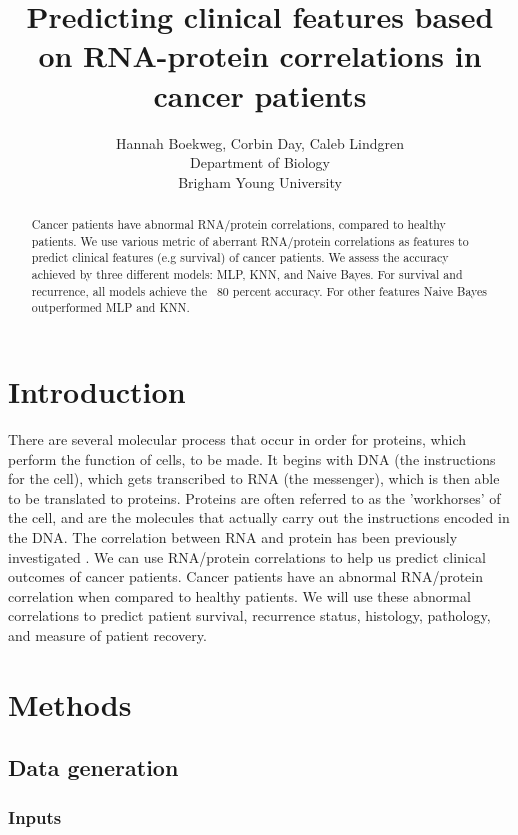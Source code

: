\documentclass{article}
\title{Predicting clinical features based on RNA-protein correlations in cancer patients}
\author{Hannah Boekweg, Corbin Day, Caleb Lindgren \\
Department of Biology\\
Brigham Young University}
\begin{document}
\maketitle

\begin{abstract}
  Cancer patients have abnormal RNA/protein correlations, compared to healthy patients.
  We use various metric of aberrant RNA/protein correlations as features to predict clinical features (e.g survival) of cancer patients.
  We assess the accuracy achieved by three different models: MLP, KNN, and Naive Bayes. For survival and recurrence, all models achieve the ~80 percent accuracy. For other features Naive Bayes outperformed MLP and KNN.

\end{abstract}

\section{Introduction}
There are several molecular process that occur in order for proteins, which perform the function of cells, to be made. 
It begins with DNA (the instructions for the cell), which gets transcribed to RNA (the messenger), which is then able to be translated to proteins. 
Proteins are often referred to as the 'workhorses' of the cell, and are the molecules that actually carry out the instructions encoded in the DNA.
The correlation between RNA and protein has been previously investigated \cite{waldbauer_transcriptome_2012} \cite{payne_utility_2015} \cite{han_transcriptome_2021}.
We can use RNA/protein correlations to help us predict clinical outcomes of cancer patients. Cancer patients have an abnormal RNA/protein correlation when compared to healthy patients. 
We will use these abnormal correlations to predict patient survival, recurrence status, histology, pathology, and measure of patient recovery. 

\section{Methods}

\subsection{Data generation}

\subsubsection{Inputs}
\end{document}
